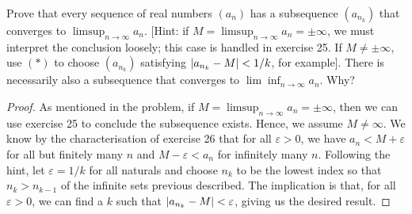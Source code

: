 \begin{exercise}{27}
Prove that every sequence of real numbers $(a_n)$ has a subsequence $(a_{n_k})$ that converges to $\limsup_{n\to\infty}a_n$. [Hint: if $M=\limsup_{n\to\infty}a_n=\pm\infty$, we must interpret the conclusion loosely; this case is handled in exercise 25. If $M\neq\pm\infty$, use $(\ast)$ to choose $(a_{n_k})$ satisfying $\left\lvert a_{n_k}-M\right\rvert<1/k$, for example]. There is necessarily also a subsequence that converges to $\lim\inf_{n\to\infty}a_n$. Why?
\end{exercise}
\begin{proof}
As mentioned in the problem, if $M=\limsup_{n\to\infty}a_n=\pm\infty$, then we can use exercise 25 to conclude the subsequence exists. Hence, we assume $M\neq\infty$. We know by the characterisation of exercise 26 that for all $\varepsilon>0$, we have $a_n<M+\varepsilon$ for all but finitely many $n$ and $M-\varepsilon<a_n$ for infinitely many $n$. Following the hint, let $\varepsilon=1/k$ for all naturals and choose $n_k$ to be the lowest index so that $n_k>n_{k-1}$ of the infinite sets previous described. The implication is that, for all $\varepsilon>0$, we can find a $k$ such that $\left\lvert a_{n_k}-M\right\rvert<\varepsilon$, giving us the desired result.
\end{proof}

